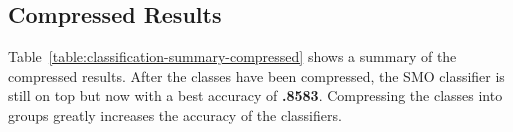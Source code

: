 \documentclass[12pt]{ucthesis}
\begin{document}
\begin{table}[H]
   \begin{center}
      \caption[Uncompressed Misclassification Example]{The SMO results with no filtering. Every misclassification that would map to the \texttt{other} group is bold.}
      \label{table:confusionMisclassification}
   \end{center}
\end{table}

\subsection{Compressed Results}
\label{class-evaluation-compressed-results}
Table~\ref{table:classification-summary-compressed} shows a summary of the compressed results.
After the classes have been compressed, the SMO classifier is still on top but now with a best accuracy
of \textbf{.8583}. Compressing the classes into groups greatly increases the accuracy of the classifiers.
\end{document}
